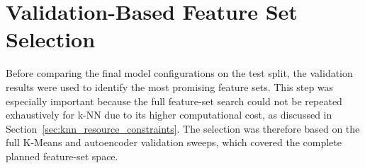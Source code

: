 \section{Validation-Based Feature Set Selection}
\label{sec:validation_feature_selection}

Before comparing the final model configurations on the test split, the validation results were used to identify the most promising feature sets. This step was especially important because the full feature-set search could not be repeated exhaustively for k-NN due to its higher computational cost, as discussed in Section~\ref{sec:knn_resource_constraints}. The selection was therefore based on the full K-Means and autoencoder validation sweeps, which covered the complete planned feature-set space. 


